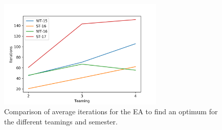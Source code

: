 \documentclass[12pt,a4paper]{article}
\begin{document}
\begin{figure}[h]
    \centering
    \includegraphics[width=0.7\textwidth]{EA_Iterations.png}
    \caption{Comparison of average iterations for the EA to find an optimum for the different teamings and semester.}
    \label{fig:ea_iterations}
\end{figure} 
\end{document}
